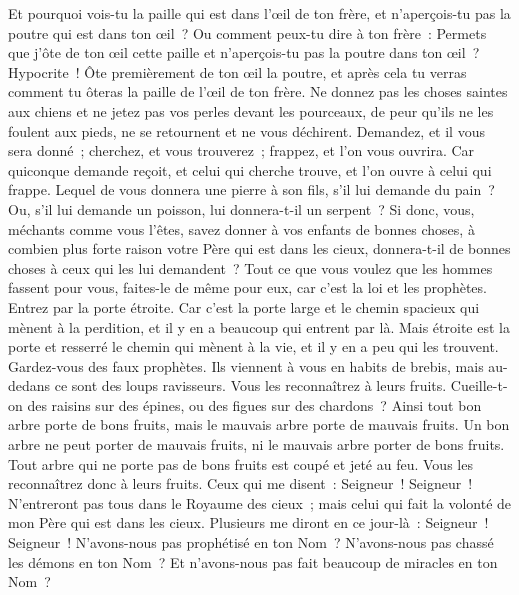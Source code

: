 \begin{multicols}{2}
Et pourquoi vois-tu la paille qui est dans l'œil de ton frère, et n'aperçois-tu pas la poutre qui est dans ton œil~?
Ou comment peux-tu dire à ton frère~: Permets que j'ôte de ton œil cette paille et n'aperçois-tu pas la poutre dans ton œil~?
Hypocrite~! Ôte premièrement de ton œil la poutre, et après cela tu verras comment tu ôteras la paille de l'œil de ton frère.
Ne donnez pas les choses saintes aux chiens et ne jetez pas vos perles devant les pourceaux, de peur qu'ils ne les foulent aux pieds, ne se retournent et ne vous déchirent.
Demandez, et il vous sera donné~; cherchez, et vous trouverez~; frappez, et l'on vous ouvrira.
Car quiconque demande reçoit, et celui qui cherche trouve, et l'on ouvre à celui qui frappe.
Lequel de vous donnera une pierre à son fils, s'il lui demande du pain~?
Ou, s'il lui demande un poisson, lui donnera-t-il un serpent~?
Si donc, vous, méchants comme vous l'êtes, savez donner à vos enfants de bonnes choses, à combien plus forte raison votre Père qui est dans les cieux, donnera-t-il de bonnes choses à ceux qui les lui demandent~?
Tout ce que vous voulez que les hommes fassent pour vous, faites-le de même pour eux, car c'est la loi et les prophètes.
Entrez par la porte étroite. Car c'est la porte large et le chemin spacieux qui mènent à la perdition, et il y en a beaucoup qui entrent par là.
Mais étroite est la porte et resserré le chemin qui mènent à la vie, et il y en a peu qui les trouvent.
Gardez-vous des faux prophètes. Ils viennent à vous en habits de brebis, mais au-dedans ce sont des loups ravisseurs.
Vous les reconnaîtrez à leurs fruits. Cueille-t-on des raisins sur des épines, ou des figues sur des chardons~?
Ainsi tout bon arbre porte de bons fruits, mais le mauvais arbre porte de mauvais fruits.
Un bon arbre ne peut porter de mauvais fruits, ni le mauvais arbre porter de bons fruits.
Tout arbre qui ne porte pas de bons fruits est coupé et jeté au feu.
Vous les reconnaîtrez donc à leurs fruits.
Ceux qui me disent~: Seigneur~! Seigneur~! N'entreront pas tous dans le Royaume des cieux~; mais celui qui fait la volonté de mon Père qui est dans les cieux.
Plusieurs me diront en ce jour-là~: Seigneur~! Seigneur~! N'avons-nous pas prophétisé en ton Nom~? N'avons-nous pas chassé les démons en ton Nom~? Et n'avons-nous pas fait beaucoup de miracles en ton Nom~?

\end{multicols}
